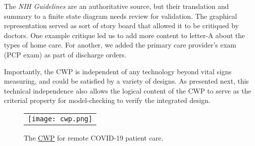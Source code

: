 The \emph{NIH Guidelines} are an authoritative source, but their translation and summary to a finite state diagram needs review for validation. 
The graphical representation served as sort of story board that allowed it to be critiqued by doctors. 
One example critique led us to add more content to letter-A about the types of home care.  
For another, we added the primary care provider's exam (PCP exam) as part of discharge orders.

Importantly, the CWP is independent of any technology beyond vital signs measuring, and could be satisfied by a variety of designs.  
As presented next, this technical independence also allows the logical content of the CWP to serve as the criterial property for model-checking to verify the integrated design.

\begin{figure}[t]
  \begin{center}
    \begin{tabular}{c}
      \texttt{[image: cwp.png]}
    \end{tabular}
  \end{center}
\caption{The \href{https://github.com/ericmercer/SPIN-bpmn-cwp-verification-paper/blob/main/26-Oct-2021-CWP.png}{CWP} for remote COVID-19 patient care.}
\label{fig:cwp}
\end{figure}